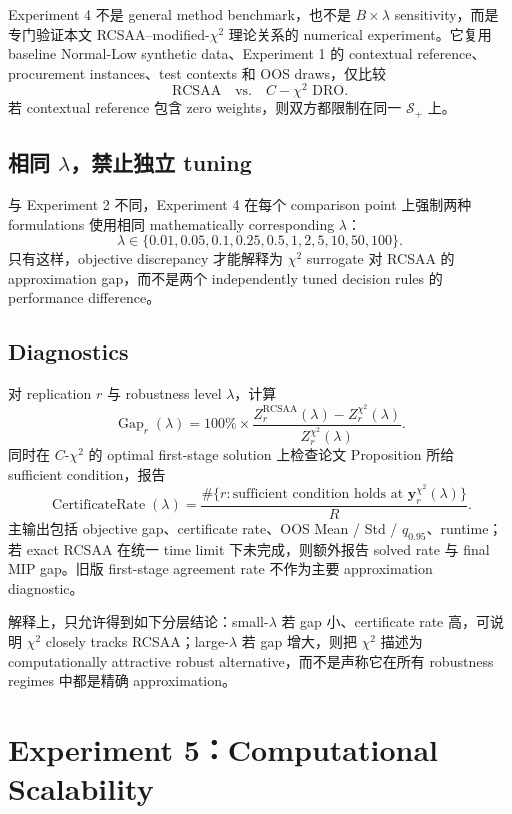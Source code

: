 \documentclass[11pt,a4paper]{ctexart}
\newcommand{\Sset}{\mathcal S}
\begin{document}
Experiment 4 不是 general method benchmark，也不是 $B\times\lambda$ sensitivity，而是专门验证本文 RCSAA--modified-$\chi^2$ 理论关系的 numerical experiment。它复用 baseline Normal-Low synthetic data、Experiment 1 的 contextual reference、procurement instances、test contexts 和 OOS draws，仅比较
\[
\boxed{\text{RCSAA}\quad\text{vs.}\quad C\!\!-
\chi^2\text{ DRO}.}
\]
若 contextual reference 包含 zero weights，则双方都限制在同一 $\Sset_+$ 上。

\subsection{相同 $\lambda$，禁止独立 tuning}

与 Experiment 2 不同，Experiment 4 在每个 comparison point 上强制两种 formulations 使用相同 mathematically corresponding $\lambda$：
\[
\lambda\in\{0.01,0.05,0.1,0.25,0.5,1,2,5,10,50,100\}.
\]
只有这样，objective discrepancy 才能解释为 $\chi^2$ surrogate 对 RCSAA 的 approximation gap，而不是两个 independently tuned decision rules 的 performance difference。

\subsection{Diagnostics}

对 replication $r$ 与 robustness level $\lambda$，计算
\[
\operatorname{Gap}_r(\lambda)
=100\%\times
\frac{Z_r^{\mathrm{RCSAA}}(\lambda)-Z_r^{\chi^2}(\lambda)}
{Z_r^{\chi^2}(\lambda)}.
\]
同时在 $C$-$\chi^2$ 的 optimal first-stage solution 上检查论文 Proposition 所给 sufficient condition，报告
\[
\operatorname{CertificateRate}(\lambda)
=\frac{\#\{r:\text{sufficient condition holds at }\boldsymbol y_r^{\chi^2}(\lambda)\}}{R}.
\]
主输出包括 objective gap、certificate rate、OOS Mean / Std / $q_{0.95}$、runtime；若 exact RCSAA 在统一 time limit 下未完成，则额外报告 solved rate 与 final MIP gap。旧版 first-stage agreement rate 不作为主要 approximation diagnostic。

解释上，只允许得到如下分层结论：small-$\lambda$ 若 gap 小、certificate rate 高，可说明 $\chi^2$ closely tracks RCSAA；large-$\lambda$ 若 gap 增大，则把 $\chi^2$ 描述为 computationally attractive robust alternative，而不是声称它在所有 robustness regimes 中都是精确 approximation。

\section{Experiment 5：Computational Scalability}
\end{document}
